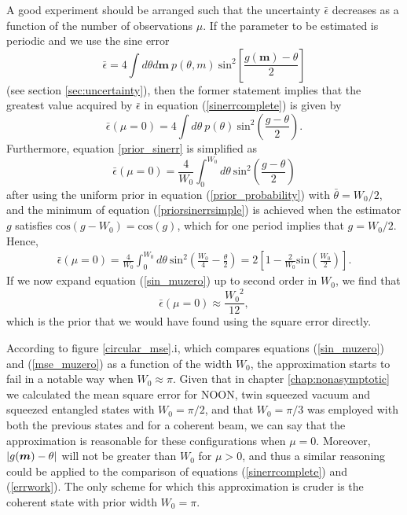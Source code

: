A good experiment should be arranged such that the uncertainty $\bar{\epsilon}$ decreases as a function of the number of observations $\mu$. If the parameter to be estimated is periodic and we use the sine error 
\begin{equation}
\bar{\epsilon} = 4\int d\theta d\boldsymbol{m} ~p(\theta,m)~\mathrm{sin}^2\left[\frac{g(\boldsymbol{m})-\theta}{2} \right]
\label{sinerrcomplete}
\end{equation} 
(see section \ref{sec:uncertainty}), then the former statement implies that the greatest value acquired by $\bar{\epsilon}$ in equation (\ref{sinerrcomplete}) is given by 
\begin{equation}
\bar{\epsilon}({\mu=0}) = 4\int d\theta ~p(\theta)~\mathrm{sin}^2\left(\frac{g - \theta}{2} \right).
\label{prior_sinerr}
\end{equation}
Furthermore, equation \ref{prior_sinerr} is simplified as
\begin{equation}
\bar{\epsilon}({\mu=0}) = \frac{4}{W_0}\int_0^{W_0} d\theta ~\mathrm{sin}^2\left(\frac{g - \theta}{2} \right)
\label{priorsinerrsimple}
\end{equation}
after using the uniform prior in equation (\ref{prior_probability}) with $\bar{\theta} = W_0/2$, and the minimum of equation (\ref{priorsinerrsimple}) is achieved when the estimator $g$ satisfies $\mathrm{cos}(g - W_0) = \mathrm{cos}(g)$, which for one period implies that $g = W_0 /2$. Hence,  
\begin{eqnarray}
\bar{\epsilon}(\mu=0) = \frac{4}{W_0}\int_0^{W_0} d\theta~ \mathrm{sin}^2\left(\frac{W_0}{4} - \frac{\theta}{2} \right)
= 2\left[1 - \frac{2}{W_0}\mathrm{sin}\left( \frac{W_0}{2}\right) \right].
\label{sin_muzero}
\end{eqnarray}
If we now expand equation (\ref{sin_muzero}) up to second order in $W_0$, we find that
\begin{equation}
\bar{\epsilon}(\mu=0) \approx \frac{{W_0}^2}{12},
\label{mse_muzero}
\end{equation}  
which is the prior that we would have found using the square error directly. 

According to figure \ref{circular_mse}.i, which compares equations (\ref{sin_muzero}) and (\ref{mse_muzero}) as a function of the width $W_0$, the approximation starts to fail in a notable way when $W_0 \approx \pi$. Given that in chapter \ref{chap:nonasymptotic} we calculated the mean square error for NOON, twin squeezed vacuum and squeezed entangled states with $W_0=\pi/2$, and that $W_0=\pi/3$ was employed with both the previous states and for a coherent beam, we can say that the approximation is reasonable for these configurations when $\mu = 0$. Moreover, $\abs{g(\boldsymbol{m}) - \theta}$ will not be greater than $W_0$ for $\mu > 0$, and thus a similar reasoning could be applied to the comparison of equations (\ref{sinerrcomplete}) and (\ref{errwork}). The only scheme for which this approximation is cruder is the coherent state with prior width $W_0 = \pi$. 

